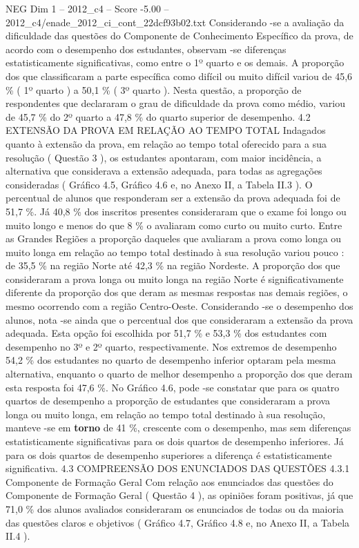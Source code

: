 \begin{textsample}{NEG Dim 1 – 2012\_c4 – Score -5.00 – 2012\_c4/enade\_2012\_ci\_cont\_22dcf93b02.txt}
Considerando -se a avaliação da dificuldade das questões do Componente de Conhecimento Específico da prova, de acordo com o desempenho dos estudantes, observam -se diferenças estatisticamente significativas, como entre o 1º quarto e os demais.
A proporção dos que classificaram a parte específica como difícil ou muito difícil variou de 45,6 \% ( 1º quarto ) a 50,1 \% ( 3º quarto ).
Nesta questão, a proporção de respondentes que declararam o grau de dificuldade da prova como médio, variou de 45,7 \% do 2º quarto a 47,8 \% do quarto superior de desempenho. 4.2 EXTENSÃO DA PROVA EM RELAÇÃO AO TEMPO TOTAL Indagados quanto à extensão da prova, em relação ao tempo total oferecido para a sua resolução ( Questão 3 ), os estudantes apontaram, com maior incidência, a alternativa que considerava a extensão adequada, para todas as agregações consideradas ( Gráfico 4.5, Gráfico 4.6 e, no Anexo II, a Tabela II.3 ).
O percentual de alunos que responderam ser a extensão da prova adequada foi de 51,7 \%.
Já 40,8 \% dos inscritos presentes consideraram que o exame foi longo ou muito longo e menos do que 8 \% o avaliaram como curto ou muito curto.
Entre as Grandes Regiões a proporção daqueles que avaliaram a prova como longa ou muito longa em relação ao tempo total destinado à sua resolução variou pouco : de 35,5 \% na região Norte até 42,3 \% na região Nordeste.
A proporção dos que consideraram a prova longa ou muito longa na região Norte é significativamente diferente da proporção dos que deram as mesmas respostas nas demais regiões, o mesmo ocorrendo com a região Centro-Oeste.
Considerando -se o desempenho dos alunos, nota -se ainda que o percentual dos que consideraram a extensão da prova adequada.
Esta opção foi escolhida por 51,7 \% e 53,3 \% dos estudantes com desempenho no 3º e 2º quarto, respectivamente.
Nos extremos de desempenho 54,2 \% dos estudantes no quarto de desempenho inferior optaram pela mesma alternativa, enquanto o quarto de melhor desempenho a proporção dos que deram esta resposta foi 47,6 \%.
No Gráfico 4.6, pode -se constatar que para os quatro quartos de desempenho a proporção de estudantes que consideraram a prova longa ou muito longa, em relação ao tempo total destinado à sua resolução, manteve -se em \textbf{torno} de 41 \%, crescente com o desempenho, mas sem diferenças estatisticamente significativas para os dois quartos de desempenho inferiores.
Já para os dois quartos de desempenho superiores a diferença é estatisticamente significativa. 4.3 COMPREENSÃO DOS ENUNCIADOS DAS QUESTÕES 4.3.1 Componente de Formação Geral Com relação aos enunciados das questões do Componente de Formação Geral ( Questão 4 ), as opiniões foram positivas, já que 71,0 \% dos alunos avaliados consideraram os enunciados de todas ou da maioria das questões claros e objetivos ( Gráfico 4.7, Gráfico 4.8 e, no Anexo II, a Tabela II.4 ).

\end{textsample}

